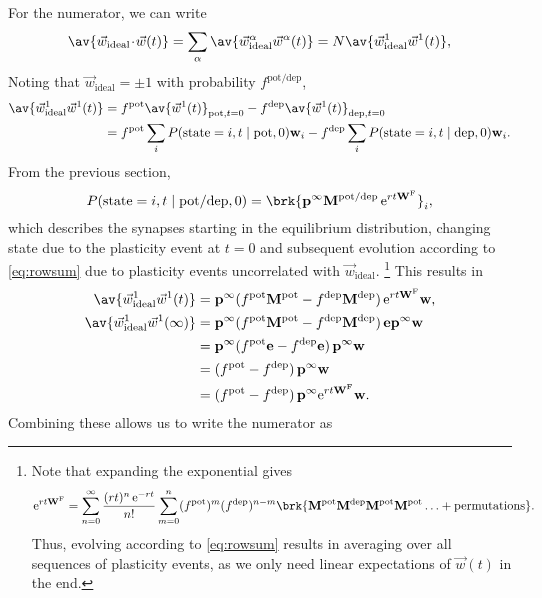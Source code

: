 \documentclass[9pt,twocolumn,twoside,lineno]{pnas-new}
\newcommand{\cdt}{\!\cdot\!}
\newcommand{\e}{\mathrm{e}}
\newcommand{\wv}{\vec{w}}
\newcommand{\wvi}{\vec{w}_\text{ideal}}
\newcommand{\onev}{\mathbf{e}}
\newcommand{\prob}{\mathbf{p}}
\newcommand{\eq}{\prob^\infty}
\newcommand{\w}{\mathbf{w}}
\newcommand{\W}{\mathbf{W}}
\newcommand{\M}{\mathbf{M}}
\newcommand{\frg}{\W^{\mathrm{F}}}
\newcommand{\pot}{^{\text{pot}}}
\newcommand{\dep}{^{\text{dep}}}
\newcommand{\potdep}{^{\text{pot/dep}}}
\begin{document}
\begin{strip}
For the numerator, we can write
%
\begin{equation}\label{eq:overlapex}
  \av{\wv_\text{ideal}\cdt\wv(t)} = \sum_\alpha\av{\wv^\alpha_\text{ideal}\wv^\alpha(t)}
   = N \av{\wv^1_\text{ideal}\wv^1(t)},
\end{equation}
%
Noting that $\wvi=\pm1$ with probability $f\potdep$,
%
\begin{equation}\label{eq:overlapstate}
\begin{aligned}
  \av{\wv^1_\text{ideal}\wv^1(t)} &= f\pot \av{\wv^1(t)}_{\text{pot},t=0} - f\dep \av{\wv^1(t)}_{\text{dep},t=0} \\
   &= f\pot \sum_i P(\text{state}=i,t \mid \text{pot},0) \w_i - f\dep \sum_i P(\text{state}=i,t \mid \text{dep},0) \w_i.
\end{aligned}
\end{equation}
%
From the previous section,
%
\begin{equation}\label{eq:stateprob}
  P(\text{state}=i,t \mid \text{pot/dep},0) = \brk{ \eq \M\potdep\, \e^{rt\frg} }_i,
\end{equation}
%
which describes the synapses starting in the equilibrium distribution, changing state due to the plasticity event at $t=0$ and subsequent evolution according to \cref{eq:rowsum} due to plasticity events uncorrelated with $\wvi$.%
\footnote{Note that expanding the exponential gives
%
\begin{equation*}
  \e^{rt\frg} =  \sum_{n=0}^\infty \frac{(rt)^n\,\e^{-rt}}{n!} \sum_{m=0}^n (f\pot)^m (f\dep)^{n-m}
  \brk{ \M\pot \M\dep \M\pot \M\pot \ldots + \text{permutations}}.
\end{equation*}
%
Thus, evolving according to \cref{eq:rowsum} results in averaging over all sequences of plasticity events,
as we only need linear expectations of $\wv(t)$ in the end.}
This results in
%
\begin{equation}\label{eq:overlapwt}
\begin{aligned}
  \av{\wv^1_\text{ideal}\wv^1(t)} &= \eq (f\pot\M\pot-f\dep\M\dep)\, \e^{rt\frg} \w, \\
  \av{\wv^1_\text{ideal}\wv^1(\infty)} &= \eq (f\pot\M\pot-f\dep\M\dep)\, \onev\eq \w \\
         &= \eq (f\pot\onev-f\dep\onev)\, \eq \w \\
         &=  (f\pot-f\dep)\, \eq \w \\
         &=  (f\pot-f\dep)\, \eq \e^{rt\frg} \w .
\end{aligned}
\end{equation}
%
Combining these allows us to write the numerator as

\end{strip}
\end{document}

